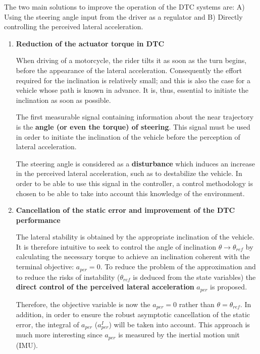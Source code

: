 The two main solutions to improve the operation of the DTC systems are: A) Using the steering angle input from the driver as a regulator and B) Directly controlling the perceived lateral acceleration.
\begin{enumerate}
\item \textbf{Reduction of the actuator torque in DTC}

When driving of a motorcycle, the rider tilts it as soon as the turn begins, before the appearance of the lateral acceleration. Consequently the effort required for the inclination is relatively small; and this is also the case for a vehicle whose path is known in advance. It is, thus, essential to initiate the inclination as soon as possible. 

The first measurable signal containing information about the near trajectory is the \textbf{angle (or even the torque) of steering}. This signal must be used in order to initiate the inclination of the vehicle before the perception of lateral acceleration. %

The steering angle is considered as a \textbf{disturbance} which induces an increase in the perceived lateral acceleration, such as to destabilize the vehicle. In order to be able to use this signal in the controller, a control methodology is chosen to be able to take into account this knowledge of the environment. 

\item \textbf{Cancellation of the static error and improvement of the DTC performance}

The lateral stability is obtained by the appropriate inclination of the vehicle. It is therefore intuitive to seek to control the angle of inclination $\theta\rightarrow\theta_{ref}$ by calculating the necessary torque to achieve an inclination coherent with the terminal objective: $a_{per}=0$. To reduce the problem of the approximation and to reduce the risks of instability ($\theta_{ref}$ is deduced from the state variables) the \textbf{direct control of the perceived lateral acceleration} $a_{per}$ is proposed.\cite{6315042}

Therefore, the objective variable is now the $a_{per}=0$ rather than $\theta=\theta_{ref}$. In addition, in order to ensure the robust asymptotic cancellation of the static error, the integral of $a_{per}$ ($a_{per}^{I}$) will be taken into account. This approach is much more interesting since $a_{per}$ is measured by the inertial motion unit (IMU).
\end{enumerate}
\newpage
